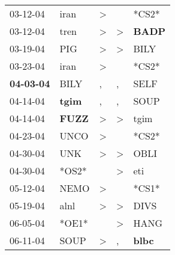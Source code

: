 \begin{supertabular}{p{0.07\textwidth}p{0.06\textwidth}p{0.02\textwidth}p{0.02\textwidth}p{0.06\textwidth}}
          03-12-04\textsuperscript{} &           iran\textsuperscript{} &     \textgreater &                  &                            *CS2* \\
          03-12-04\textsuperscript{} &           tren\textsuperscript{} &     \textgreater &     \textgreater &  \textbf{BADP\textsuperscript{}} \\
          03-19-04\textsuperscript{} &            PIG\textsuperscript{} &     \textgreater &     \textgreater &           BILY\textsuperscript{} \\
          03-23-04\textsuperscript{} &           iran\textsuperscript{} &     \textgreater &                  &                            *CS2* \\
 \textbf{04-03-04\textsuperscript{}} &           BILY\textsuperscript{} &                , &                , &           SELF\textsuperscript{} \\
          04-14-04\textsuperscript{} &  \textbf{tgim\textsuperscript{}} &                , &                , &           SOUP\textsuperscript{} \\
          04-14-04\textsuperscript{} &  \textbf{FUZZ\textsuperscript{}} &     \textgreater &     \textgreater &           tgim\textsuperscript{} \\
          04-23-04\textsuperscript{} &           UNCO\textsuperscript{} &     \textgreater &                  &                            *CS2* \\
          04-30-04\textsuperscript{} &            UNK\textsuperscript{} &     \textgreater &     \textgreater &           OBLI\textsuperscript{} \\
          04-30-04\textsuperscript{} &                            *OS2* &                  &     \textgreater &            eti\textsuperscript{} \\
          05-12-04\textsuperscript{} &           NEMO\textsuperscript{} &     \textgreater &                  &                            *CS1* \\
          05-19-04\textsuperscript{} &           alnl\textsuperscript{} &     \textgreater &     \textgreater &           DIVS\textsuperscript{} \\
          06-05-04\textsuperscript{} &                            *OE1* &                  &     \textgreater &           HANG\textsuperscript{} \\
          06-11-04\textsuperscript{} &           SOUP\textsuperscript{} &     \textgreater &                , &  \textbf{blbc\textsuperscript{}} \\

\end{supertabular}
